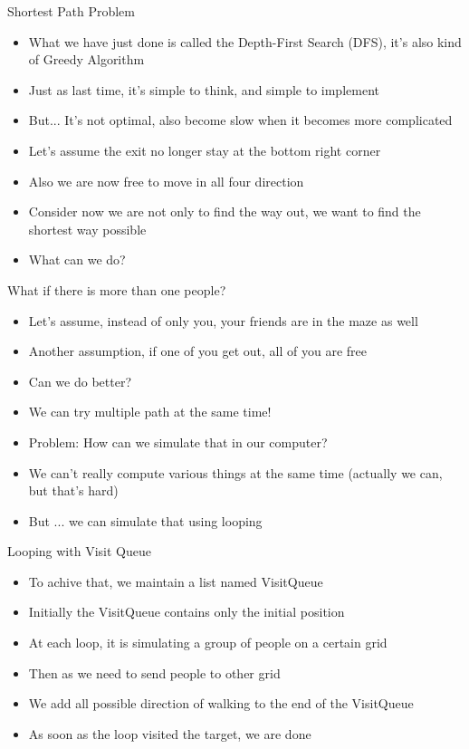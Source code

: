 \documentclass[10pt,xcolor={table,dvipsnames},t]{beamer}
\begin{document}
\begin{frame}[fragile]{Shortest Path Problem}
  \begin{itemize}
    \item What we have just done is called the Depth-First Search (DFS), it's also kind of Greedy Algorithm
    \item Just as last time, it's simple to think, and simple to implement
    \item But... It's not optimal, also become slow when it becomes more complicated
    \item Let's assume the exit no longer stay at the bottom right corner
    \item Also we are now free to move in all four direction
    \item Consider now we are not only to find the way out, we want to find the shortest way possible
    \item What can we do?
  \end{itemize}
\end{frame}

\begin{frame}[fragile]{What if there is more than one people?}
  \begin{itemize}
    \item Let's assume, instead of only you, your friends are in the maze as well
    \item Another assumption, if one of you get out, all of you are free
    \item Can we do better?
    \item We can try multiple path at the same time!
    \item Problem: How can we simulate that in our computer?
    \item We can't really compute various things at the same time (actually we can, but that's hard)
    \item But ... we can simulate that using looping
  \end{itemize}
\end{frame}

\begin{frame}{Looping with Visit Queue}
  \begin{itemize}
    \item To achive that, we maintain a list named VisitQueue
    \item Initially the VisitQueue contains only the initial position
    \item At each loop, it is simulating a group of people on a certain grid
    \item Then as we need to send people to other grid
    \item We add all possible direction of walking to the end of the VisitQueue
    \item As soon as the loop visited the target, we are done
  \end{itemize}
\end{frame}
\end{document}
